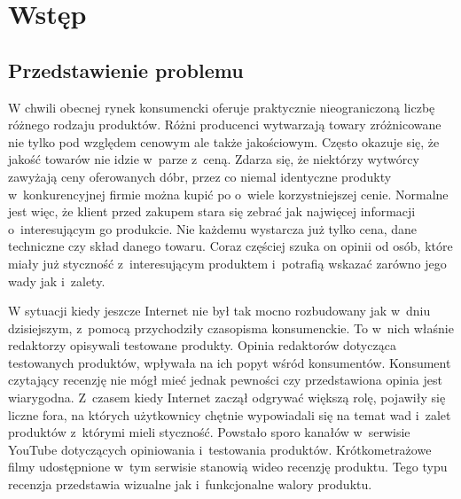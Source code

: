 \chapter{Wstęp}

\section{Przedstawienie problemu}
W chwili obecnej rynek konsumencki oferuje praktycznie nieograniczoną liczbę różnego rodzaju produktów. Różni producenci wytwarzają towary zróżnicowane nie tylko pod względem cenowym ale także jakościowym. Często okazuje się, że jakość towarów nie idzie w~parze z~ceną. Zdarza się, że niektórzy wytwórcy  zawyżają ceny oferowanych dóbr, przez co niemal identyczne produkty w~konkurencyjnej firmie można kupić po o~wiele korzystniejszej cenie. Normalne jest więc, że klient przed zakupem stara się zebrać jak najwięcej informacji o~interesującym go produkcie. Nie każdemu wystarcza już tylko cena, dane techniczne czy skład danego towaru.  Coraz częściej szuka on opinii od osób, które miały już styczność z~interesującym produktem i~potrafią wskazać zarówno jego wady jak i~zalety. 

W sytuacji kiedy jeszcze Internet nie był tak mocno rozbudowany jak w~dniu dzisiejszym, z~pomocą przychodziły czasopisma konsumenckie. To w~nich właśnie redaktorzy opisywali testowane produkty. Opinia redaktorów dotycząca testowanych produktów, wpływała na ich popyt wśród konsumentów. Konsument czytający recenzję nie mógł mieć jednak pewności czy przedstawiona opinia jest wiarygodna. Z~czasem kiedy Internet zaczął odgrywać większą rolę, pojawiły się liczne fora, na których użytkownicy chętnie wypowiadali się na temat wad i~zalet produktów z~którymi mieli styczność. Powstało sporo kanałów w~serwisie YouTube dotyczących opiniowania i~testowania produktów. Krótkometrażowe filmy udostępnione w~tym serwisie stanowią wideo recenzję produktu.  Tego typu recenzja przedstawia wizualne jak i~funkcjonalne walory produktu. 

